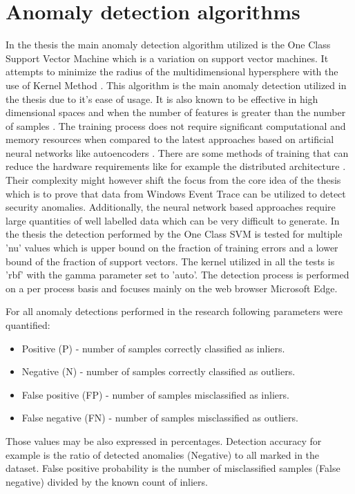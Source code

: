 \documentclass[a4paper,twoside,12pt]{book}
\begin{document}
\section{Anomaly detection algorithms}
In the thesis the main anomaly detection algorithm utilized is the One Class Support 
Vector Machine which is a variation on support vector machines. It attempts to minimize 
the radius of the multidimensional hypersphere with the use of Kernel Method \cite{bib:ocsvm}. 
This algorithm is the main anomaly detection utilized in the thesis due to it's ease of
usage. It is also known to be effective in high dimensional spaces and when 
the number of features is greater than the number of samples \cite{bib:svms}. The training process 
does not require significant computational and memory resources when compared to the latest
approaches based on artificial neural networks like autoencoders \cite{bib:autoencoder}. There are
some methods of training that can reduce the hardware requirements like for example the distributed architecture
\cite{bib:autoencoderDist}. Their complexity might however shift the focus from the core idea 
of the thesis which is to prove that data from Windows Event Trace can be utilized to detect security
anomalies. Additionally, the neural network based approaches require large quantities of well labelled
data which can be very difficult to generate. In the thesis the detection performed by the One Class SVM 
is tested for multiple 'nu' values which is upper bound on the fraction of training errors and a lower bound of the 
fraction of support vectors\cite{bib:skocsvm}. The kernel utilized in all the tests is 'rbf' with
the gamma parameter set to 'auto'. The detection process is performed 
on a per process basis and focuses mainly on the web browser Microsoft Edge. 

For all anomaly detections performed in the research following parameters were quantified:
\begin{itemize}
	\item Positive (P) - number of samples correctly classified as inliers.
	\item Negative (N) - number of samples correctly classified as outliers.
	\item False positive (FP) - number of samples misclassified as inliers. 
	\item False negative (FN) - number of samples misclassified as outliers.
\end{itemize}

Those values may be also expressed in percentages. Detection accuracy for example is the ratio
of detected anomalies (Negative) to all marked in the dataset. False positive probability is 
the number of misclassified samples (False negative) divided by the known count of inliers.  
\end{document}
